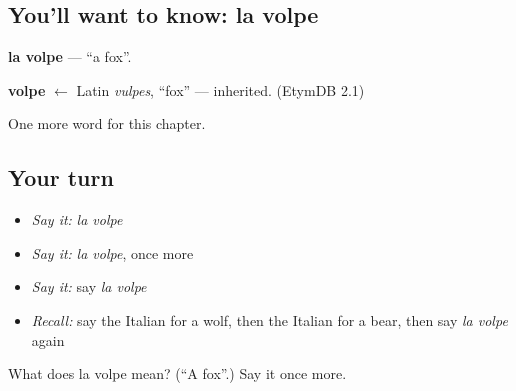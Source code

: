 \subsection*{You'll want to know: la volpe}
\textbf{la volpe} — \textquotedblleft{}a fox\textquotedblright{}.

\begin{cousinweb}
\textbf{volpe} $\leftarrow$ Latin \emph{vulpes}, \textquotedblleft{}fox\textquotedblright{} — inherited. (EtymDB 2.1)
\end{cousinweb}

\begin{grammarlens}[title={What you've built}]
One more word for this chapter.
\end{grammarlens}

\subsection*{Your turn}
\begin{itemize}
\raggedright
  \item \emph{Say it:} \emph{la volpe}
  \item \emph{Say it:} \emph{la volpe}, once more
  \item \emph{Say it:} say \emph{la volpe}
  \item \emph{Recall:} say the Italian for a wolf, then the Italian for a bear, then say \emph{la volpe} again
\end{itemize}

\begin{tcolorbox}[breakable,colback=teal!4,colframe=teal!35!black,title={Before you move on}]
What does la volpe mean? (\textquotedblleft{}A fox\textquotedblright{}.) Say it once more.
\end{tcolorbox}
